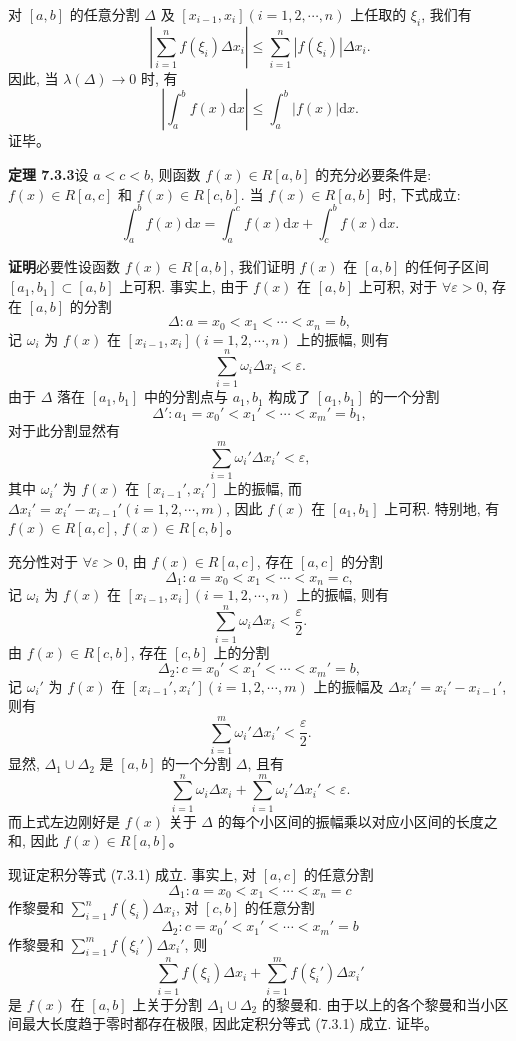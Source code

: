 \documentclass[UTF8,12pt,a4paper,fontset=fandol]{ctexart}
\begin{document}
对 $[a,b]$ 的任意分割 $\Delta$ 及 $[x_{i-1},x_i](i=1,2,\cdots,n)$ 上任取的 $\xi_i$, 我们有
\[
  \left|\sum_{i=1}^n f(\xi_i)\Delta x_i\right|
  \leq \sum_{i=1}^n |f(\xi_i)|\Delta x_i.
\]
因此, 当 $\lambda(\Delta)\to0$ 时, 有
\[
  \left|\int_a^b f(x)\mathrm dx\right|\leq \int_a^b |f(x)|\mathrm dx.
\]
证毕。

\noindent\textbf{定理 7.3.3}\quad 设 $a<c<b$, 则函数 $f(x)\in R[a,b]$ 的充分必要条件是: $f(x)\in R[a,c]$ 和 $f(x)\in R[c,b]$. 当 $f(x)\in R[a,b]$ 时, 下式成立:
\begin{equation}
  \int_a^b f(x)\mathrm dx=\int_a^c f(x)\mathrm dx+\int_c^b f(x)\mathrm dx.
  \tag{7.3.1}
\end{equation}

\noindent\textbf{证明}\quad 必要性\quad 设函数 $f(x)\in R[a,b]$, 我们证明 $f(x)$ 在 $[a,b]$ 的任何子区间 $[a_1,b_1]\subset[a,b]$ 上可积. 事实上, 由于 $f(x)$ 在 $[a,b]$ 上可积, 对于 $\forall\varepsilon>0$, 存在 $[a,b]$ 的分割
\[
  \Delta:a=x_0<x_1<\cdots<x_n=b,
\]
记 $\omega_i$ 为 $f(x)$ 在 $[x_{i-1},x_i](i=1,2,\cdots,n)$ 上的振幅, 则有
\[
  \sum_{i=1}^n \omega_i\Delta x_i<\varepsilon.
\]
由于 $\Delta$ 落在 $[a_1,b_1]$ 中的分割点与 $a_1,b_1$ 构成了 $[a_1,b_1]$ 的一个分割
\[
  \Delta':a_1=x_0'<x_1'<\cdots<x_m'=b_1,
\]
对于此分割显然有
\[
  \sum_{i=1}^m \omega_i'\Delta x_i'<\varepsilon,
\]
其中 $\omega_i'$ 为 $f(x)$ 在 $[x_{i-1}',x_i']$ 上的振幅, 而 $\Delta x_i'=x_i'-x_{i-1}'(i=1,2,\cdots,m)$, 因此 $f(x)$ 在 $[a_1,b_1]$ 上可积. 特别地, 有 $f(x)\in R[a,c]$, $f(x)\in R[c,b]$。

充分性\quad 对于 $\forall\varepsilon>0$, 由 $f(x)\in R[a,c]$, 存在 $[a,c]$ 的分割
\[
  \Delta_1:a=x_0<x_1<\cdots<x_n=c,
\]
记 $\omega_i$ 为 $f(x)$ 在 $[x_{i-1},x_i](i=1,2,\cdots,n)$ 上的振幅, 则有
\[
  \sum_{i=1}^n\omega_i\Delta x_i<\frac{\varepsilon}{2}.
\]
由 $f(x)\in R[c,b]$, 存在 $[c,b]$ 上的分割
\[
  \Delta_2:c=x_0'<x_1'<\cdots<x_m'=b,
\]
记 $\omega_i'$ 为 $f(x)$ 在 $[x_{i-1}',x_i'](i=1,2,\cdots,m)$ 上的振幅及 $\Delta x_i'=x_i'-x_{i-1}'$, 则有
\[
  \sum_{i=1}^m\omega_i'\Delta x_i'<\frac{\varepsilon}{2}.
\]
显然, $\Delta_1\cup\Delta_2$ 是 $[a,b]$ 的一个分割 $\Delta$, 且有
\[
  \sum_{i=1}^n\omega_i\Delta x_i+\sum_{i=1}^m\omega_i'\Delta x_i'<\varepsilon.
\]
而上式左边刚好是 $f(x)$ 关于 $\Delta$ 的每个小区间的振幅乘以对应小区间的长度之和, 因此 $f(x)\in R[a,b]$。

现证定积分等式 (7.3.1) 成立. 事实上, 对 $[a,c]$ 的任意分割
\[
  \Delta_1:a=x_0<x_1<\cdots<x_n=c
\]
作黎曼和 $\sum_{i=1}^n f(\xi_i)\Delta x_i$, 对 $[c,b]$ 的任意分割
\[
  \Delta_2:c=x_0'<x_1'<\cdots<x_m'=b
\]
作黎曼和 $\sum_{i=1}^m f(\xi_i')\Delta x_i'$, 则
\[
  \sum_{i=1}^n f(\xi_i)\Delta x_i+\sum_{i=1}^m f(\xi_i')\Delta x_i'
\]
是 $f(x)$ 在 $[a,b]$ 上关于分割 $\Delta_1\cup\Delta_2$ 的黎曼和. 由于以上的各个黎曼和当小区间最大长度趋于零时都存在极限, 因此定积分等式 (7.3.1) 成立. 证毕。
\end{document}
